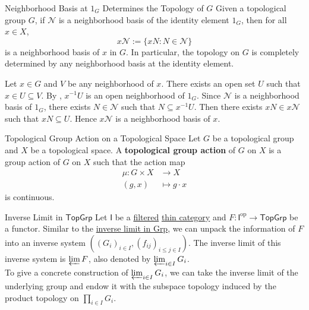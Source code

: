 \begin{proposition}{Neighborhood Basis at $1_G$ Determines the Topology of $G$}{}
    Given a topological group $G$, if $\mathcal{N}$ is a neighborhood basis of the identity element $1_G$, then for all $x \in X$, 
    \[
        x \mathcal{N}:=\{x N: N \in \mathcal{N}\}
    \] 
    is a neighborhood basis of $x$ in $G$. In particular, the topology on $G$ is completely determined by any neighborhood basis at the identity element.
\end{proposition}

\begin{prf}
    Let $x \in G$ and $V$ be any neighborhood of $x$. There exists an open set $U$ such that $x\in U\subseteq V$. By , $x^{-1} U$ is an open neighborhood of $1_G$. Since $\mathcal{N}$ is a neighborhood basis of $1_G$, there exists $N \in \mathcal{N}$ such that $N \subseteq x^{-1} U$. Then there exists $x N \in x \mathcal{N}$ such that $x N \subseteq U$. Hence $x \mathcal{N}$ is a neighborhood basis of $x$.
\end{prf}


\begin{definition}{Topological Group Action on a Topological Space}{}
    Let $G$ be a topological group and $X$ be a topological space. A \textbf{topological group action} of $G$ on $X$ is a group action of $G$ on $X$ such that the action map
    \begin{align*}
        \mu:G\times X&\longrightarrow X\\
        (g,x)&\longmapsto g\cdot x
    \end{align*}
    is continuous.
\end{definition}

\begin{definition}{Inverse Limit in $\mathsf{TopGrp}$}{}
    Let $\mathsf{I}$ be a \hyperref[th:filtered_category]{filtered} \hyperref[th:thin_category]{thin category} and $F:\mathsf{I}^{\mathrm{op}}\to \mathsf{TopGrp}$ be a functor. Similar to the \hyperref[th:inverse_limit_of_groups]{inverse limit in \textsf{Grp}}, we can unpack the information of $F$ into an inverse system $\left(\left(G_i\right)_{i \in I},\left(f_{i j}\right)_{i \leq j \in I}\right)$. The inverse limit of this inverse system is $\varprojlim F$, also denoted by $\varprojlim_{i\in I}G_i$.\\
    To give a concrete construction of $\varprojlim_{i\in I}G_i$, we can take the inverse limit of the underlying group and endow it with the subspace topology induced by the product topology on $\prod_{i\in I}G_i$.
\end{definition}



